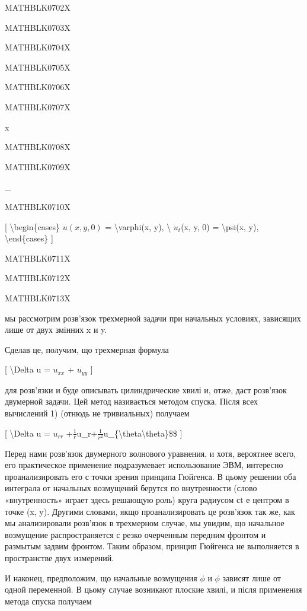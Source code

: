 \documentclass[
]{article}
\begin{document}
{{MATHBLK0702X

MATHBLK0703X

MATHBLK0704X

MATHBLK0705X

MATHBLK0706X

MATHBLK0707X

x

MATHBLK0708X

MATHBLK0709X

\_ \textbar{}

MATHBLK0710X

{[} \textbackslash begin\{cases\} \(u(x, y, 0)\) =
\textbackslash varphi(x, y), \textbackslash{} \(u_t\)(x, y, 0) =
\textbackslash psi(x, y), \textbackslash end\{cases\} {]}

MATHBLK0711X

MATHBLK0712X

MATHBLK0713X

мы рассмотрим розв'язок трехмерной задачи при начальных условиях,
зависящих лише от двух змінних x и y.

Сделав це, получим, що трехмерная формула

{[} \textbackslash Delta u = \(u_{xx}\) + \(u_{yy}\) {]}

для розв'язки и буде описывать цилиндрические хвилі и, отже, даст
розв'язок двумерной задачи. Цей метод називається методом спуска. Після
всех вычислений 1) (отнюдь не тривиальных) получаем

{[} \textbackslash Delta u = \(u_{rr}\)
+\(\frac{1}{r}\)u\_r\(+ \frac{1}{r^2}\)u\_\{\textbackslash theta\textbackslash theta\}\$\$
{]}

Перед нами розв'язок двумерного волнового уравнения, и хотя, вероятнее
всего, его практическое применение подразумевает использование ЭВМ,
интересно проанализировать его с точки зрения принципа Гюйгенса. В цьому
решении оба интеграла от начальных возмущений берутся по внутренности
(слово «внутренность» играет здесь решающую роль) круга радиусом сt е
центром в точке (x, y). Другими словами, якщо проанализировать це
розв'язок так же, как мы анализировали розв'язок в трехмерном случае, мы
увидим, що начальное возмущение распространяется с резко очерченным
передним фронтом и размытым задвим фронтом. Таким образом, принцип
Гюйгенса не выполняется в пространстве двух измерений.

И наконец, предположим, що начальные возмущения \(\phi\) и \(\phi\)
зависят лише от одной переменной. В цьому случае возникают плоские
хвилі, и після применения метода спуска получаем

}}
\end{document}
